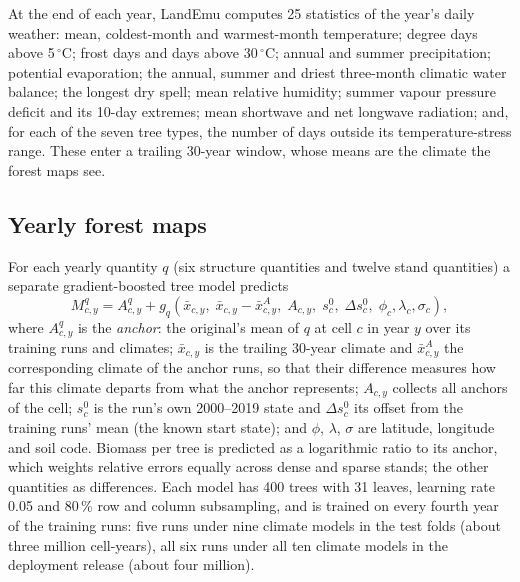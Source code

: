\documentclass[11pt,a4paper]{article}
\begin{document}
At the end of each year, LandEmu computes 25 statistics of the year's daily weather: mean, coldest-month and
warmest-month temperature; degree days above 5\,$^\circ$C; frost days and days above 30\,$^\circ$C; annual and summer
precipitation; potential evaporation; the annual, summer and driest three-month climatic water balance; the longest
dry spell; mean relative humidity; summer vapour pressure deficit and its 10-day extremes; mean shortwave and net
longwave radiation; and, for each of the seven tree types, the number of days outside its temperature-stress range.
These enter a trailing 30-year window, whose means are the climate the forest maps see.

\subsection{Yearly forest maps}\label{sec:maps}

For each yearly quantity $q$ (six structure quantities and twelve stand quantities) a separate gradient-boosted tree
model \citep{Ke2017} predicts
\begin{equation}
  M^{q}_{c,y} = A^{q}_{c,y} + g_q\!\left(\bar{x}_{c,y},\; \bar{x}_{c,y} - \bar{x}^{A}_{c,y},\; A_{c,y},\;
  s^{0}_{c},\; \Delta s^{0}_{c},\; \phi_c,\lambda_c,\sigma_c\right),\label{eq:map}
\end{equation}
where $A^{q}_{c,y}$ is the \emph{anchor}: the original's mean of $q$ at cell $c$ in year $y$ over its training runs
and climates; $\bar{x}_{c,y}$ is the trailing 30-year climate and $\bar{x}^{A}_{c,y}$ the corresponding climate of the
anchor runs, so that their difference measures how far this climate departs from what the anchor represents;
$A_{c,y}$ collects all anchors of the cell; $s^{0}_{c}$ is the run's own 2000--2019 state and $\Delta s^{0}_{c}$ its
offset from the training runs' mean (the known start state); and $\phi$, $\lambda$, $\sigma$ are latitude, longitude
and soil code. Biomass per tree is predicted as a logarithmic ratio to its anchor, which weights relative errors
equally across dense and sparse stands; the other quantities as differences. Each model has 400 trees with 31 leaves,
learning rate 0.05 and 80\,\% row and column subsampling, and is trained on every fourth year of the training runs:
five runs under nine climate models in the test folds (about three million cell-years), all six runs under all ten
climate models in the deployment release (about four million).
\end{document}
